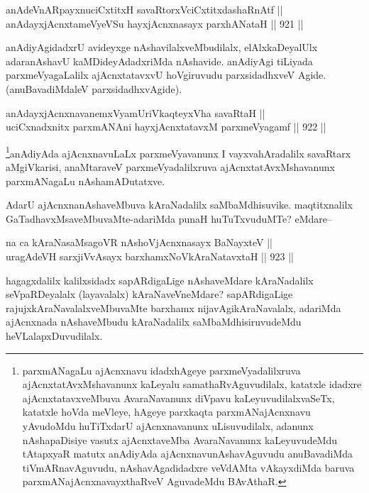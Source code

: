 \begin{shl}
anAdeVnARpayxnuciCxtitxH savaRtorxVciCxtitxdashaRnAtf || \\
anAdayxjAcnxtameVyeVSu hayxjAcnxnasayx parxhANataH \hfill || 921 ||  
\end{shl}

\begin{artha}
anAdiyAgidadxrU avideyxge nAshavilalxveMbudilalx, elAlxkaDeyalUlx adaranAshavU kaMDideyAdadxriMda nAshavide. anAdiyAgi tiLiyada parxmeVyagaLalilx ajAcnxtatavxvU hoVgiruvudu parxsidadhxveV Agide.(anuBavadiMdaleV parxsidadhxvAgide).
\end{artha}


\begin{shl}
anAdayxjAcnxnavanemxVyamUriVkaqteyxVha savaRtaH || \\
uciCxnadxnitx parxmANAni hayxjAcnxtatavxM parxmeVyagamf \hfill || 922 ||  
\end{shl}

\begin{artha}
\footnote{parxmANagaLu ajAcnxnavu idadxhAgeye parxmeVyadalilxruva ajAcnxtatAvxMshavanunx kaLeyalu samathaRvAguvudilalx, katatxle idadxre ajAcnxtatavxveMbuva AvaraNavanunx diVpavu kaLeyuvudilalxvaSeTx, katatxle hoVda meVleye, hAgeye parxkaqta parxmANajAcnxnavu yAvudoMdu huTiTxdarU ajAcnxnavanunx uLisuvudilalx, adanunx nAshapaDisiye vasutx ajAcnxtaveMba AvaraNavanunx kaLeyuvudeMdu tAtapxyaR matutx anAdiyAda ajAcnxnavunAshavAguvudu anuBavadiMda tiVmARnavAguvudu, nAshavAgadidadxre veVdAMta vAkayxdiMda baruva parxmANajAcnxnavayxthaRveV AguvadeMdu BAvAthaR.}anAdiyAda ajAcnxnavuLaLx parxmeVyavanunx I vayxvahAradalilx savaRtarx aMgiVkarisi, anaMtaraveV parxmeVyadalilxruva ajAcnxtatAvxMshavanunx parxmANagaLu nAshamADutatxve.
\end{artha}

\begin{artha}
AdarU ajAcnxnanAshaveMbuva kAraNadalilx saMbaMdhisuvike. maqtitxnalilx GaTadhavxMsaveMbuvaMte-adariMda punaH huTuTxvuduMTe? eMdare{\rm --}
\end{artha}

\begin{shl}
na ca kAraNasaMsagoVR nAshoV\s jAcnxnasayx BaNayxteV || \\
uragAdeVH sarxjiVvAsayx barxhamxNoV\s kAraNatavxtaH \hfill || 923 ||  
\end{shl}

\begin{artha}
hagagxdalilx kalilxsidadx sapARdigaLige nAshaveMdare kAraNadalilx seVpaRDeyalalx (layavalalx) kAraNaveVneMdare? sapARdigaLige rajujxkAraNavalalxveMbuvaMte barxhamx nijavAgikAraNavalalx, adariMda ajAcnxnada nAshaveMbudu kAraNadalilx saMbaMdhisiruvudeMdu heVLalapxDuvudilalx.
\end{artha}

